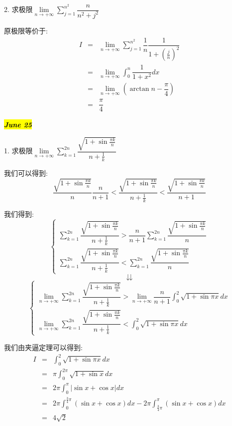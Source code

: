 2. 求极限$\lim\limits_{n\rightarrow+\infty}\sum\limits_{j=1}^{n^2}\dfrac{n}{n^2+j^2}$
\begin{solution}
	
	原极限等价于: 
	\begin{eqnarray*}
		I&=&\lim\limits_{n\rightarrow+\infty}\sum\limits_{j=1}^{n^2}\dfrac{1}{n}\dfrac{1}{1+(\frac{j}{n})^2}\\
		&=&\lim\limits_{n\rightarrow+\infty}\int_{0}^{n}\dfrac{1}{1+x^2}dx\\
		&=&\lim\limits_{n\rightarrow+\infty}(\arctan n-\dfrac{\pi}{4})\\
		&=&\dfrac{\pi}{4}
	\end{eqnarray*}
\end{solution}

\hl{\textbf{\textit{June 25}}}

1. 求极限$\lim\limits_{n\rightarrow+\infty}\sum\limits_{k=1}^{2n}\dfrac{\sqrt{1+\sin \frac{\pi k}{n}}}{n+\frac{1}{k}}$
\begin{solution}
	
	我们可以得到: 
	$$\dfrac{\sqrt{1+\sin \frac{\pi k}{n}}}{n}\dfrac{n}{n+1}<\dfrac{\sqrt{1+\sin \frac{\pi k}{n}}}{n+\frac{1}{k}}<\dfrac{\sqrt{1+\sin \frac{\pi k}{n}}}{n+1}$$
	
	我们得到: 
	$$\left\lbrace
	\begin{array}{l}
		\sum\limits_{k=1}^{2n}\dfrac{\sqrt{1+\sin \frac{\pi k}{n}}}{n+\frac{1}{k}}>\dfrac{n}{n+1}\sum\limits_{k=1}^{2n}\dfrac{\sqrt{1+\sin \frac{\pi k}{n}}}{n}\\
		\sum\limits_{k=1}^{2n}\dfrac{\sqrt{1+\sin \frac{\pi k}{n}}}{n+\frac{1}{k}}<\sum\limits_{k=1}^{2n}\dfrac{\sqrt{1+\sin \frac{\pi k}{n}}}{n}
	\end{array}
	\right.$$ 
	$$\downdownarrows$$ 
	$$\left\lbrace
	\begin{array}{l}
		\lim\limits_{n\rightarrow+\infty}\sum\limits_{k=1}^{2n}\dfrac{\sqrt{1+\sin \frac{\pi k}{n}}}{n+\frac{1}{k}}>\lim\limits_{n\rightarrow+\infty}\dfrac{n}{n+1}\int_{0}^{2}\sqrt{1+\sin \pi x}dx\\
		\lim\limits_{n\rightarrow+\infty}\sum\limits_{k=1}^{2n}\dfrac{\sqrt{1+\sin \frac{\pi k}{n}}}{n+\frac{1}{k}}<\int_{0}^{2}\sqrt{1+\sin \pi x}dx
	\end{array}
	\right. $$
	
	我们由夹逼定理可以得到: 
	\begin{eqnarray*}
		I&=&\int_{0}^{2}\sqrt{1+\sin \pi x}dx\\
		&=&\pi\int_{0}^{2\pi}\sqrt{1+\sin x}dx\\
		&=&2\pi\int_{0}^{\pi}|\sin x+\cos x|dx\\
		&=&2\pi\int_{0}^{\frac{3}{4}\pi}(\sin x+\cos x)dx-2\pi\int_{\frac{3}{4}\pi}^{\pi}(\sin x+\cos x)dx\\
		&=&4\sqrt{2}
	\end{eqnarray*}
\end{solution}

